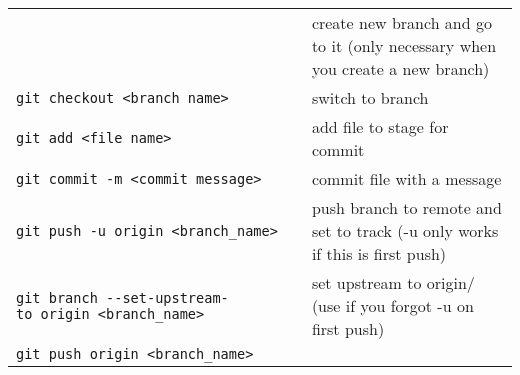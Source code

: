 \documentclass[
]{book}
\begin{document}
\begin{longtable}[]{@{}ll@{}}
\begin{minipage}[t]{0.34\columnwidth}
\end{minipage} & \begin{minipage}[t]{0.60\columnwidth}\raggedright
create new branch and go to it (only necessary when you create a new branch)\strut
\end{minipage}\tabularnewline
\begin{minipage}[t]{0.34\columnwidth}\raggedright
\texttt{git\ checkout\ \textless{}branch\ name\textgreater{}}\strut
\end{minipage} & \begin{minipage}[t]{0.60\columnwidth}\raggedright
switch to branch\strut
\end{minipage}\tabularnewline
\begin{minipage}[t]{0.34\columnwidth}\raggedright
\texttt{git\ add\ \textless{}file\ name\textgreater{}}\strut
\end{minipage} & \begin{minipage}[t]{0.60\columnwidth}\raggedright
add file to stage for commit\strut
\end{minipage}\tabularnewline
\begin{minipage}[t]{0.34\columnwidth}\raggedright
\texttt{git\ commit\ -m\ \textless{}commit\ message\textgreater{}}\strut
\end{minipage} & \begin{minipage}[t]{0.60\columnwidth}\raggedright
commit file with a message\strut
\end{minipage}\tabularnewline
\begin{minipage}[t]{0.34\columnwidth}\raggedright
\texttt{git\ push\ -u\ origin\ \textless{}branch\_name\textgreater{}}\strut
\end{minipage} & \begin{minipage}[t]{0.60\columnwidth}\raggedright
push branch to remote and set to track (-u only works if this is first push)\strut
\end{minipage}\tabularnewline
\begin{minipage}[t]{0.34\columnwidth}\raggedright
\texttt{git\ branch\ -\/-set-upstream-to\ origin\ \textless{}branch\_name\textgreater{}}\strut
\end{minipage} & \begin{minipage}[t]{0.60\columnwidth}\raggedright
set upstream to origin/ (use if you forgot -u on first push)\strut
\end{minipage}\tabularnewline
\begin{minipage}[t]{0.34\columnwidth}\raggedright
\texttt{git\ push\ origin\ \textless{}branch\_name\textgreater{}}\strut

\end{minipage}
\end{longtable}
\end{document}
